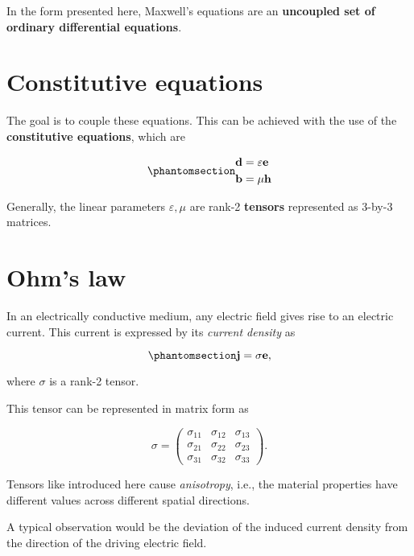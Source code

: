 \documentclass[
  a4paper,
  DIV=11,
  numbers=noendperiod]{scrreprt}
\begin{document}
In the form presented here, Maxwell's equations are an \textbf{uncoupled
set of ordinary differential equations}.

\section{Constitutive equations}\label{constitutive-equations}

The goal is to couple these equations. This can be achieved with the use
of the \textbf{constitutive equations}, which are

\begin{equation}\phantomsection\label{eq-constitutive-equations}{
\begin{align}
\mathbf d & = \varepsilon \mathbf e \\
\mathbf b & = \mu \mathbf h
\end{align}
}\end{equation}

Generally, the linear parameters \(\varepsilon, \mu\) are rank-2
\textbf{tensors} represented as 3-by-3 matrices.

\section{Ohm's law}\label{ohms-law}

In an electrically conductive medium, any electric field gives rise to
an electric current. This current is expressed by its \emph{current
density} as

\begin{equation}\phantomsection\label{eq-ohms-law}{
\mathbf j = \sigma \mathbf e,
}\end{equation}

where \(\sigma\) is a rank-2 tensor.

This tensor can be represented in matrix form as

\[
\sigma =   \begin{pmatrix}    \sigma_{11} & \sigma_{12} & \sigma_{13} \\    \sigma_{21} & \sigma_{22} & \sigma_{23} \\    \sigma_{31} & \sigma_{32} & \sigma_{33}   \end{pmatrix}.
\]

Tensors like introduced here cause \emph{anisotropy}, i.e., the material
properties have different values across different spatial directions.

A typical observation would be the deviation of the induced current
density from the direction of the driving electric field.
\end{document}
